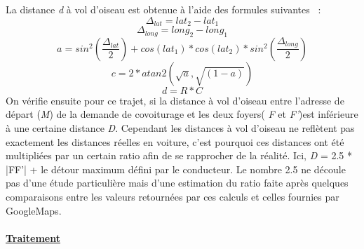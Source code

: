 \documentclass[12pt, a4paper, oneside]{article}
\begin{document}
     La distance \textit{d} à vol d'oiseau est obtenue à l'aide des formules suivantes ~\cite{haversine-script}:
    \begin{equation*}
        \Delta_{lat} = lat_{2} - lat_{1}
    \end{equation*}
    \begin{equation*}
        \Delta_{long} = long_{2} - long_{1}
    \end{equation*}
    \begin{equation*}
        a = sin^{2}(\frac{\Delta_{lat}}{2}) + cos(lat_{1}) * cos(lat_{2}) * sin^{2}(\frac{\Delta_{long}}{2})
    \end{equation*}
     \begin{equation*}
         c = 2 * atan2(\sqrt{a},\sqrt{(1-a)})
     \end{equation*}
     \begin{equation*}
        d = R * C
     \end{equation*}     
     On vérifie ensuite pour ce trajet, si la distance à vol d'oiseau entre l'adresse de départ (\textit{M}) de la demande de covoiturage et les deux foyers( \textit{F} et \textit{F'})est inférieure à une certaine distance \textit{D}. Cependant les distances à vol d'oiseau ne reflètent pas exactement les distances réelles en voiture, c'est pourquoi ces distances ont été multipliées par un certain ratio afin de se rapprocher de la réalité. Ici, \textit{D} = 2.5 * |FF'| + le détour maximum défini par le conducteur. Le nombre 2.5 ne découle pas d'une étude particulière mais d'une estimation du ratio faite après quelques comparaisons entre les valeurs retournées par ces calculs et celles fournies par GoogleMaps.\\\\
     \underline{\textbf{Traitement}}\\\\
\end{document}
